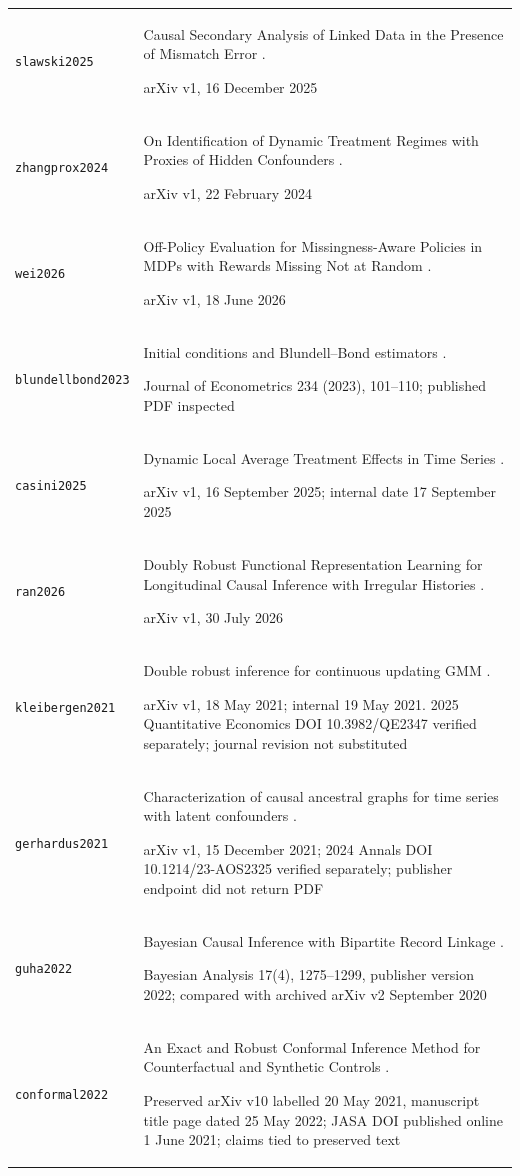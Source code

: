 \begin{longtable}{P{32mm}P{112mm}}
{\scriptsize\texttt{slawski2025}} & Causal Secondary Analysis of Linked Data in the Presence of Mismatch Error \citep{slawski2025}.\par arXiv v1, 16 December 2025\\
{\scriptsize\texttt{zhangprox2024}} & On Identification of Dynamic Treatment Regimes with Proxies of Hidden Confounders \citep{zhangprox2024}.\par arXiv v1, 22 February 2024\\
{\scriptsize\texttt{wei2026}} & Off-Policy Evaluation for Missingness-Aware Policies in MDPs with Rewards Missing Not at Random \citep{wei2026}.\par arXiv v1, 18 June 2026\\
{\scriptsize\texttt{blundellbond2023}} & Initial conditions and Blundell–Bond estimators \citep{blundellbond2023}.\par Journal of Econometrics 234 (2023), 101--110; published PDF inspected\\
{\scriptsize\texttt{casini2025}} & Dynamic Local Average Treatment Effects in Time Series \citep{casini2025}.\par arXiv v1, 16 September 2025; internal date 17 September 2025\\
{\scriptsize\texttt{ran2026}} & Doubly Robust Functional Representation Learning for Longitudinal Causal Inference with Irregular Histories \citep{ran2026}.\par arXiv v1, 30 July 2026\\
{\scriptsize\texttt{kleibergen2021}} & Double robust inference for continuous updating GMM \citep{kleibergen2021}.\par arXiv v1, 18 May 2021; internal 19 May 2021. 2025 Quantitative Economics DOI 10.3982/QE2347 verified separately; journal revision not substituted\\
{\scriptsize\texttt{gerhardus2021}} & Characterization of causal ancestral graphs for time series with latent confounders \citep{gerhardus2021}.\par arXiv v1, 15 December 2021; 2024 Annals DOI 10.1214/23-AOS2325 verified separately; publisher endpoint did not return PDF\\
{\scriptsize\texttt{guha2022}} & Bayesian Causal Inference with Bipartite Record Linkage \citep{guha2022}.\par Bayesian Analysis 17(4), 1275–1299, publisher version 2022; compared with archived arXiv v2 September 2020\\
{\scriptsize\texttt{conformal2022}} & An Exact and Robust Conformal Inference Method for Counterfactual and Synthetic Controls \citep{conformal2022}.\par Preserved arXiv v10 labelled 20 May 2021, manuscript title page dated 25 May 2022; JASA DOI published online 1 June 2021; claims tied to preserved text\\

\end{longtable}
